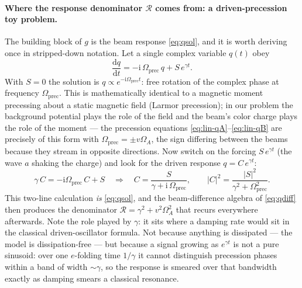 \documentclass[11pt,a4paper]{article}
\numberwithin{equation}{section}
\theoremstyle{remark}
\newcommand{\OmA}{\Omega_A}
\newcommand{\R}{\mathcal{R}}
\newcommand{\dd}{\mathrm{d}}
\newcommand{\ii}{\mathrm{i}}
\begin{document}
\paragraph{Where the response denominator $\R$ comes from: a
driven-precession toy problem.}
The building block of $g$ is the beam response \eqref{eq:qsol}, and it
is worth deriving once in stripped-down notation. Let a single complex
variable $q(t)$ obey
\begin{equation}
\frac{\dd q}{\dd t}=-\ii\,\Omega_{\mathrm{prec}}\,q+S\,e^{\gamma t}.
\label{eq:toyprec}
\end{equation}
With $S=0$ the solution is $q\propto e^{-\ii\Omega_{\mathrm{prec}}t}$:
free rotation of the complex phase at frequency
$\Omega_{\mathrm{prec}}$. This is mathematically identical to a magnetic
moment precessing about a static magnetic field (Larmor precession); in
our problem the background potential plays the role of the field and the
beam's color charge plays the role of the moment --- the precession
equations \eqref{eq:lin-qA}--\eqref{eq:lin-qB} are precisely of this
form with $\Omega_{\mathrm{prec}}=\pm v\OmA$, the sign differing between
the beams because they stream in opposite directions. Now switch on the
forcing $S\,e^{\gamma t}$ (the wave $a$ shaking the charge) and look for
the driven response $q=C\,e^{\gamma t}$:
\begin{equation}
\gamma\,C=-\ii\Omega_{\mathrm{prec}}\,C+S
\quad\Longrightarrow\quad
C=\frac{S}{\gamma+\ii\,\Omega_{\mathrm{prec}}},
\qquad
|C|^2=\frac{|S|^2}{\gamma^2+\Omega_{\mathrm{prec}}^2}.
\label{eq:toyresponse}
\end{equation}
This two-line calculation \emph{is} \eqref{eq:qsol}, and the
beam-difference algebra of \eqref{eq:qdiff} then produces the
denominator $\R=\gamma^2+v^2\OmA^2$ that recurs everywhere afterwards.
Note the role played by $\gamma$: it sits where a damping rate would sit
in the classical driven-oscillator formula. Not because anything is
dissipated --- the model is dissipation-free --- but because a signal
growing as $e^{\gamma t}$ is not a pure sinusoid: over one $e$-folding
time $1/\gamma$ it cannot distinguish precession phases within a band of
width $\sim\gamma$, so the response is smeared over that bandwidth
exactly as damping smears a classical resonance.
\end{document}
